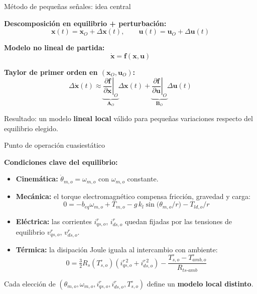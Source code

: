 \documentclass[aspectratio=169,t]{beamer}
\begin{document}
\begin{frame}{Método de pequeñas señales: idea central}
\vspace{3mm}

\textbf{Descomposición en equilibrio + perturbación:}
\begin{equation*}
\bm{x}(t)=\bm{x}_O+\Delta\bm{x}(t),
\qquad
\bm{u}(t)=\bm{u}_O+\Delta\bm{u}(t)
\end{equation*}

\textbf{Modelo no lineal de partida:}
\begin{equation*}
\dot{\bm{x}}=\bm{f}(\bm{x},\bm{u})
\end{equation*}

\textbf{Taylor de primer orden en $(\bm{x}_O,\bm{u}_O)$:}
\begin{equation*}
\Delta\dot{\bm{x}}(t)\approx
\underbrace{\left.\frac{\partial \bm{f}}{\partial \bm{x}}\right|_O}_{\bm{A}_O}
\Delta\bm{x}(t)+
\underbrace{\left.\frac{\partial \bm{f}}{\partial \bm{u}}\right|_O}_{\bm{B}_O}
\Delta\bm{u}(t)
\end{equation*}

{\small Resultado: un modelo \textbf{lineal local} válido para pequeñas variaciones respecto del equilibrio elegido.}
\end{frame}

\begin{frame}{Punto de operación cuasiestático}
\vspace{3mm}

\textbf{Condiciones clave del equilibrio:}
\begin{itemize}
  \item \textbf{Cinemática:} $\dot{\theta}_{m,o}=\omega_{m,o}$ con $\omega_{m,o}$ constante.
  \item \textbf{Mecánica:} el torque electromagnético compensa fricción, gravedad y carga:
  \[
  0=-b_{eq}\omega_{m,o}+T_{m,o}-g\,k_l\sin\!\big(\theta_{m,o}/r\big)-T_{ld,o}/r
  \]
  \item \textbf{Eléctrica:} las corrientes $i^r_{qs,o}$, $i^r_{ds,o}$ quedan fijadas por las tensiones de equilibrio $v^r_{qs,o}$, $v^r_{ds,o}$.
  \item \textbf{Térmica:} la disipación Joule iguala al intercambio con ambiente:
  \[
  0=\tfrac{3}{2}R_s(T_{s,o}^\circ)\!\left(i^{r\,2}_{qs,o}+i^{r\,2}_{ds,o}\right)-\frac{T_{s,o}^\circ-T_{amb,o}^\circ}{R_{ts\text{-}amb}}
  \]
\end{itemize}

{\small Cada elección de $(\theta_{m,o},\omega_{m,o},i^r_{qs,o},i^r_{ds,o},T_{s,o}^\circ)$ define un \textbf{modelo local distinto}.}
\end{frame}
\end{document}
